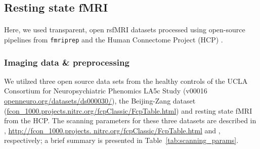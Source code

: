 \documentclass[oneside]{zHenriquesLab-StyleBioRxiv}
\begin{document}
\subsection*{Resting state fMRI}
\paragraph{}
Here, we used transparent, open rsfMRI datasets processed using open-source pipelines from \verb|fmriprep| \cite{esteban2019fmriprep} and the Human Connectome Project (HCP) \cite{van2013wu}. 
\subsubsection*{Imaging data \& preprocessing}
We utilzed three open source data sets from the healthy controls of the UCLA Consortium for Neuropsychiatric Phenomics LA5c Study \cite{poldrack2016phenome} (v00016 \url{openneuro.org/datasets/ds000030/}), the Beijing-Zang dataset (\url{fcon_1000.projects.nitrc.org/fcpClassic/FcpTable.html}) and resting state fMRI from the HCP. The scanning parameters for these three datasets are described in \cite{esteban2019fmriprep}, \url{http://fcon_1000.projects. nitrc.org/fcpClassic/FcpTable.html} and \cite{van2013wu}, respectively; a brief summary is presented in Table~\ref{tab:scanning_params}.
\end{document}
